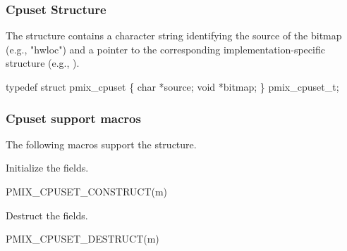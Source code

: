 \subsubsection{Cpuset Structure}

The  structure contains a character string identifying the source of the bitmap (e.g., "hwloc") and a pointer to the corresponding implementation-specific structure (e.g., ).

\cspecificstart
\begin{codepar}
typedef struct pmix_cpuset \{
    char *source;
    void *bitmap;
\} pmix_cpuset_t;
\end{codepar}
\cspecificend

\subsubsection{Cpuset support macros}
The following macros support the  structure.


Initialize the  fields.

\cspecificstart
\begin{codepar}
PMIX_CPUSET_CONSTRUCT(m)
\end{codepar}
\cspecificend

\begin{arglist}
\end{arglist}


Destruct the  fields.

\cspecificstart
\begin{codepar}
PMIX_CPUSET_DESTRUCT(m)
\end{codepar}
\cspecificend

\begin{arglist}
\end{arglist}



